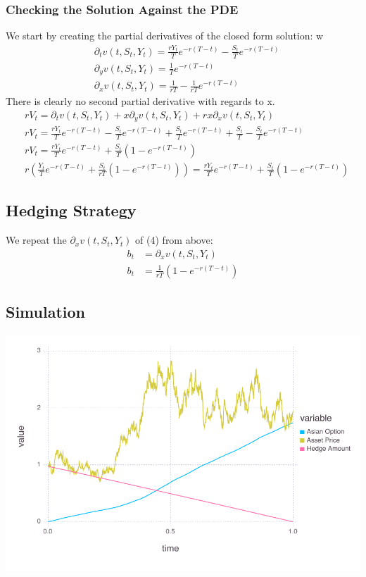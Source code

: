 \documentclass[a4paper,12pt]{article}
\begin{document}
\subsubsection{Checking the Solution Against the PDE}
We start by creating the partial derivatives of the closed form solution:
w\begin{align*}
&\partial_tv(t, S_t, Y_t) = \frac{rY_t}{T}e^{-r(T -  t)} - \frac{S_t}{T} e^{-r(T -  t)} \\
&\partial_yv(t, S_t, Y_t) = \frac{1}{T}e^{-r(T -  t)} \\
&\partial_xv(t, S_t, Y_t) = \frac{1}{rT} - \frac{1}{rT}e^{-r(T -  t)}
\end{align*}
There is clearly no second partial derivative with regards to x.
\begin{align*}
&rV_t = \partial_t v(t, S_t, Y_t) + x \partial_y v(t, S_t, Y_t) + rx \partial_x v(t, S_t, Y_t) \\
&rV_t = \frac{rY_t}{T}e^{-r(T -  t)} - \frac{S_t}{T} e^{-r(T -  t)} + \frac{S_t}{T}e^{-r(T -  t)} + \frac{S_t}{T} - \frac{S_t}{T}e^{-r(T -  t)} \\
&rV_t = \frac{rY_t}{T}e^{-r(T -  t)} + \frac{S_t}{T}(1 - e^{-r(T -  t)}) \\
&r(\frac{Y_t}{T}e^{-r(T -  t)} + \frac{S_t}{rT}(1 - e^{-r(T -  t)})) = \frac{rY_t}{T}e^{-r(T -  t)} + \frac{S_t}{T}(1 - e^{-r(T -  t)})
\end{align*}

\subsection{Hedging Strategy}
We repeat the $\partial_xv(t, S_t, Y_t)$ of (4) from above:
\begin{align*}
b_t &= \partial_xv(t, S_t, Y_t) \\
b_t &= \frac{1}{rT}(1 - e^{-r(T -  t)})
\end{align*}

\subsection{Simulation}

\includegraphics[width=\linewidth]{figures/problemset_1_1.pdf}
\end{document}
